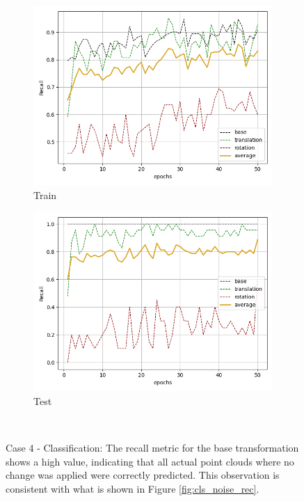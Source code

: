 \begin{figure}[H]
    \begin{subfigure}{.48\linewidth}
    \centering
    \includegraphics[scale=0.45]{Img/cls_flow_noise_train_rec.png}
    \caption{Train}
    \end{subfigure}
    \begin{subfigure}{.48\linewidth}
    \centering
    \includegraphics[scale=0.45]{Img/cls_flow_noise_test_rec.png}
    \caption{Test}
    \end{subfigure}\\
    \caption{Case 4 - Classification: The recall metric for the base transformation shows a high value, indicating that all actual point clouds where no change was applied were correctly predicted. This observation is consistent with what is shown in Figure \ref{fig:cls_noise_rec}.}
    \label{fig:cls_flow_noise_rec}
\end{figure}
